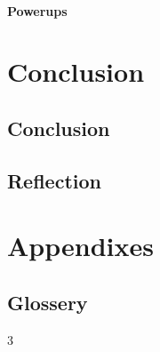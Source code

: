\begin{multicols}{3}
\subsection{Powerups}


\part{Conclusion}

\chapter{Conclusion}
\chapter{Reflection}



\part{Appendixes}
\chapter{Glossery}

% 
% 

\end{multicols}{3}

